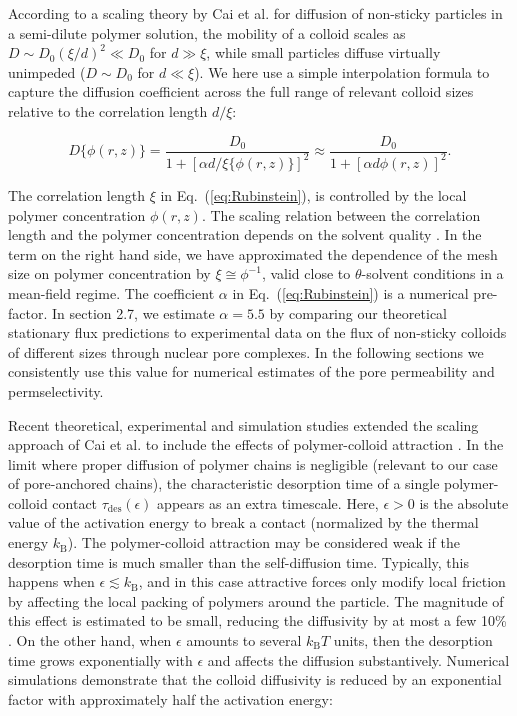 \documentclass[12pt, a4paper]{article}
\begin{document}
According to a scaling theory by Cai et al. \cite{Cai2011} for diffusion of non-sticky particles in a semi-dilute polymer solution, the mobility of a colloid scales as $D\sim D_0 (\xi/d)^2\ll D_0$ for $d\gg \xi$, while small particles diffuse virtually unimpeded ($D\sim D_0$ for $d\ll \xi$). We here use a simple interpolation formula to capture the diffusion coefficient across the full range of relevant colloid sizes relative to the correlation length $d / \xi$:

\begin{equation}
    D\{\phi(r,z)\} = \frac{D_0}{1+[\alpha d / \xi\{\phi(r,z)\}]^2} \approx \frac{D_0}{1+[\alpha d \phi(r,z)]^2} .
    \label{eq:Rubinstein}
\end{equation}

The correlation length $\xi$ in Eq.~(\ref{eq:Rubinstein}), is controlled by the local polymer concentration $\phi(r,z)$.
The scaling relation between the correlation length and the polymer concentration depends on the solvent quality \cite{DeGennes1979}.
In the term on the right hand side, we have approximated the dependence of the mesh size on polymer concentration by $\xi \cong \phi^{-1}$, valid close to $\theta$-solvent conditions in a mean-field regime.
The coefficient $\alpha$ in Eq.~(\ref{eq:Rubinstein}) is a numerical pre-factor.
In section 2.7, we estimate $\alpha = 5.5$ by comparing our theoretical stationary flux predictions to experimental data on the flux of non-sticky colloids of different sizes through nuclear pore  complexes.
In the following sections we consistently use this value for numerical estimates of the pore permeability and permselectivity.  

Recent theoretical, experimental and simulation studies extended the scaling approach of Cai et al. \cite{Cai2011} to include the effects of polymer-colloid attraction \cite{Yamamoto2018, Carroll2018}.
In the limit where proper diffusion of polymer chains is negligible (relevant to our case of pore-anchored chains), the characteristic desorption time of a single polymer-colloid contact $\tau_\text{des}(\epsilon)$ appears as an extra timescale.
Here, $\epsilon > 0$ is the absolute value of the activation energy to break a contact (normalized by the thermal energy $k_\text{B}$).
The polymer-colloid attraction may be considered weak if the desorption time is much smaller than the self-diffusion time.
Typically, this happens when $\epsilon \lesssim k_\text{B}$, and in this case attractive forces only modify local friction by affecting the local packing of polymers around the particle.
The magnitude of this effect is estimated to be small, reducing the diffusivity by at most a few 10\% \cite{Yamamoto2011}.
On the other hand, when $\epsilon$ amounts to several $k_\text{B} T$ units, then the desorption time grows exponentially with $\epsilon$ and affects the diffusion substantively.
Numerical simulations \cite{Yamamoto2018} demonstrate that the colloid diffusivity is reduced by an exponential factor with approximately half the activation energy:
\end{document}
